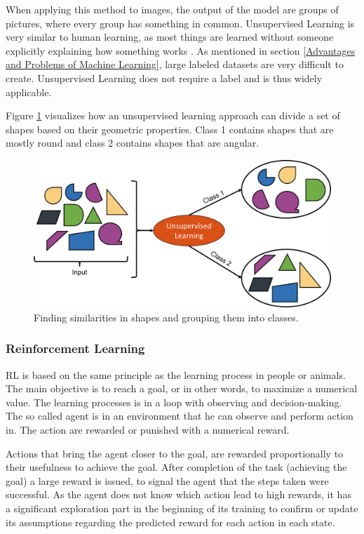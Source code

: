 When applying this method to images, the output of the model are groups of pictures, where every group has something in common. Unsupervised Learning is very similar to human learning, as most things are learned without someone explicitly explaining how something works \cite{Murphy}. As mentioned in section \ref{Advantages and Problems of Machine Learning}, large labeled datasets are very difficult to create. Unsupervised Learning does not require a label and is thus widely applicable.

Figure \ref{fig:USL} visualizes how an unsupervised learning approach can divide a set of shapes based on their geometric properties. Class 1 contains shapes that are mostly round and class 2 contains shapes that are angular. 

\begin{figure}[H]
	\centering
	\includegraphics[width=0.9\linewidth]{IMGs/USL.png}
 	\caption{Finding similarities in shapes and grouping them into classes.}
 	\label{fig:USL}
\end{figure}


\subsubsection*{Reinforcement Learning}

RL is based on the same principle as the learning process in people or animals. The main objective is to reach a goal, or in other words, to maximize a numerical value. The learning processes is in a loop with observing and decision-making. The so called agent is in an environment that he can observe and perform action in. The action are rewarded or punished with a numerical reward. \cite{LEX}
 
Actions that bring the agent closer to the goal, are rewarded proportionally to their usefulness to achieve the goal. After completion of the task (achieving the goal) a large reward is issued, to signal the agent that the steps taken were successful. As the agent does not know which action lead to high rewards, it has a significant exploration part in the beginning of its training to confirm or update its assumptions regarding the predicted reward for each action in each state. \cite{Sutton}


